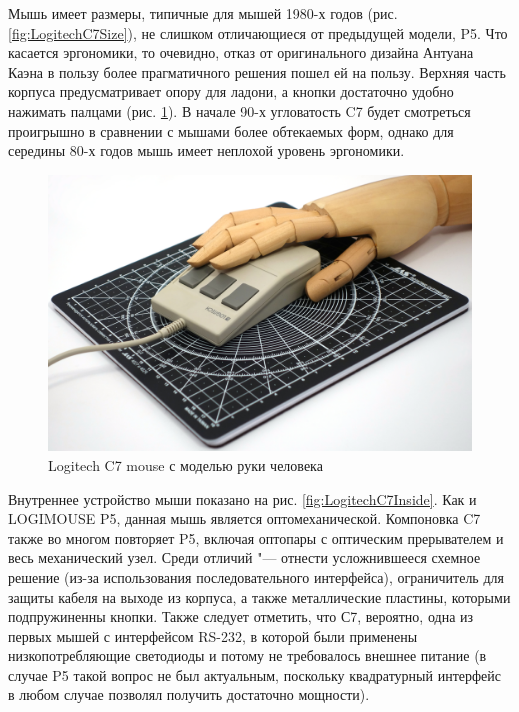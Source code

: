 \documentclass[11pt, a4paper]{article}
\begin{document}
Мышь имеет размеры, типичные для мышей 1980-х годов (рис. \ref{fig:LogitechC7Size}), не слишком отличающиеся от предыдущей модели, P5. Что касается эргономики, то очевидно, отказ от оригинального дизайна Антуана Каэна в пользу более прагматичного решения пошел ей на пользу. Верхняя часть корпуса предусматривает опору для ладони, а кнопки достаточно удобно нажимать палцами (рис. \ref{fig:LogitechC7Hand}). В начале 90-х угловатость C7 будет смотреться 
проигрышно в сравнении с мышами более обтекаемых форм, однако для середины 80-х годов мышь имеет неплохой уровень эргономики.

\begin{figure}[h]
    \centering
    \includegraphics[scale=0.35]{1985_logitech_c7_mouse/hand_30.jpg}
    \caption{Logitech C7 mouse с моделью руки человека}
    \label{fig:LogitechC7Hand}
\end{figure}

Внутреннее устройство мыши показано на рис. \ref{fig:LogitechC7Inside}. Как и LOGIMOUSE P5, данная мышь является оптомеханической. Компоновка C7 также во многом повторяет P5, включая оптопары с оптическим прерывателем и весь механический узел. Среди отличий "---  отнести усложнившееся схемное решение (из-за использования последовательного интерфейса), ограничитель для защиты кабеля на выходе из корпуса, а также металлические пластины, которыми подпружиненны кнопки. Также следует отметить, что С7, вероятно, одна из первых мышей с интерфейсом RS-232, в которой были применены низкопотребляющие светодиоды и потому не требовалось внешнее питание (в случае P5 такой вопрос не был актуальным, поскольку квадратурный интерфейс в любом случае позволял получить достаточно мощности).
\end{document}
